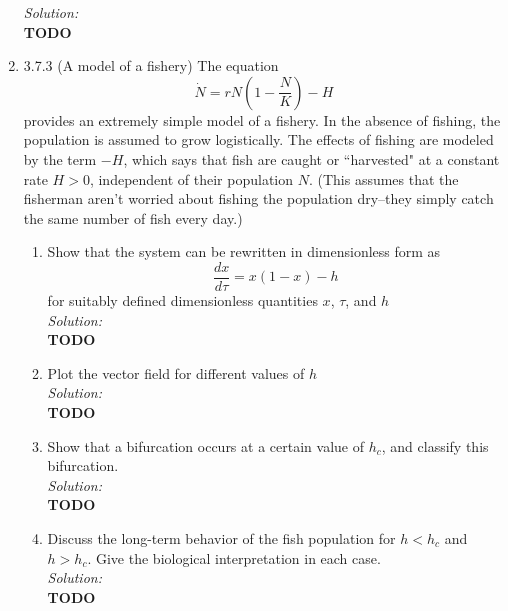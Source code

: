 \documentclass[10pt]{amsart}
\theoremstyle{nonumberplain}
\begin{document}
\begin{enumerate}[label={\bf {\arabic*}:}]
\noindent
\textit{Solution:} \\
\textbf{TODO} \\

\newpage

\item 3.7.3 (A model of a fishery) The equation
$$\dot N = rN\left( 1 - \frac N K \right) - H$$
provides an extremely simple model of a fishery.
In the absence of fishing, the population is assumed to grow logistically. 
The effects of fishing are modeled by the term $-H$, which says that fish are caught or ``harvested" at a constant rate $H > 0$, independent of their population $N$.
(This assumes that the fisherman aren't worried about fishing the population dry--they simply catch the same number of fish every day.) \\

\begin{enumerate}

\item Show that the system can be rewritten in dimensionless form as 
$$
\frac {dx}{d\tau} = x(1 - x) - h
$$
for suitably defined dimensionless quantities $x$, $\tau$, and $h$ \\

\noindent
\textit{Solution:} \\
\textbf{TODO} \\

\item Plot the vector field for different values of $h$ \\

\noindent
\textit{Solution:} \\
\textbf{TODO} \\

\item Show that a bifurcation occurs at a certain value of $h_c$, and classify this bifurcation. \\

\noindent
\textit{Solution:} \\
\textbf{TODO} \\

\item Discuss the long-term behavior of the fish population for $h < h_c$ and $h > h_c$. 
Give the biological interpretation in each case. \\

\noindent
\textit{Solution:} \\
\textbf{TODO} \\

\end{enumerate}

\end{enumerate}
\end{document}
